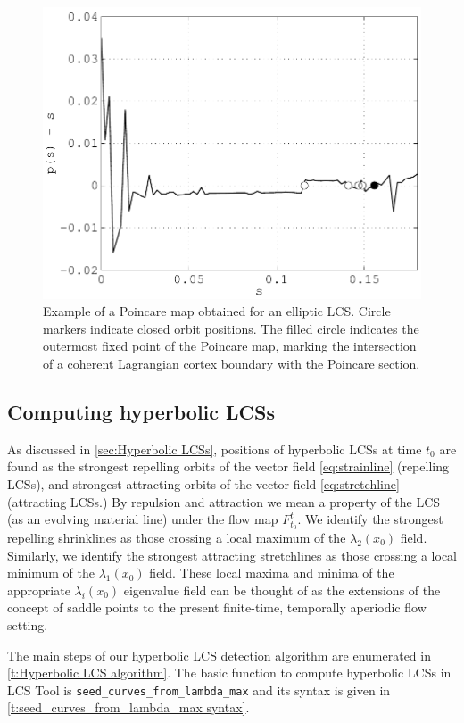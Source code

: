 \documentclass{article}
\begin{document}
\begin{figure}
\begin{center}
\includegraphics[width=.8\textwidth]{graphics/double_gyre/poincare_return_map}
\end{center}
\caption{Example of a Poincare map obtained for an elliptic LCS. Circle markers indicate closed orbit positions. The filled circle indicates the outermost fixed point of the Poincare map, marking the intersection of a coherent Lagrangian cortex boundary with the Poincare section.}
\label{f:Poincare return map}
\end{figure}

\subsection{Computing hyperbolic LCSs}

As discussed in \cref{sec:Hyperbolic LCSs}, positions of hyperbolic LCSs at time $t_0$ are found as the strongest repelling orbits of the vector field \cref{eq:strainline} (repelling LCSs), and strongest attracting orbits of the vector field \cref{eq:stretchline} (attracting LCSs.) By repulsion and attraction we mean a property of the LCS (as an evolving material line) under the flow map $F_{t_0}^t$. We identify the strongest repelling shrinklines as those crossing a local maximum of the $\lambda_2(x_0)$ field. Similarly, we identify the strongest attracting stretchlines as those crossing a local minimum of the $\lambda_1(x_0)$ field. These local maxima and minima of the appropriate $\lambda_i(x_0)$ eigenvalue field can be thought of as the extensions of the concept of saddle points to the present finite-time, temporally aperiodic flow setting.

The main steps of our hyperbolic LCS detection algorithm are enumerated in \cref{t:Hyperbolic LCS algorithm}. The basic function to compute hyperbolic LCSs in LCS Tool is \lstinline!seed_curves_from_lambda_max! and its syntax is given in \cref{t:seed_curves_from_lambda_max syntax}.
\end{document}
